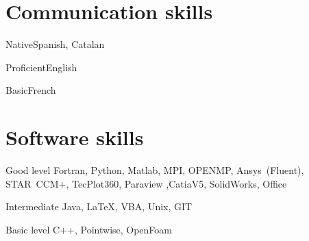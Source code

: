 \documentclass[fontsize=10pt]{tccv}
\begin{document}
\section{Communication skills}

\begin{factlist}
\item{Native}{Spanish, Catalan}
\item{Proficient}{English}
\item{Basic}{French}
\end{factlist}

\section{Software skills}

\begin{factlist}

\item{Good level}
     {Fortran, Python, Matlab, MPI, OPENMP, Ansys~(Fluent), STAR~CCM+, TecPlot360, Paraview ,CatiaV5, SolidWorks, Office}

\item{Intermediate}
     {Java, \LaTeX, VBA,  Unix, GIT}

\item{Basic level}
     {C++, Pointwise, OpenFoam}

\end{factlist}
\end{document}
